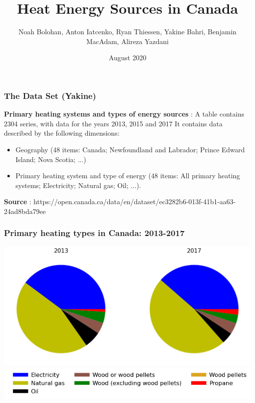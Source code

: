 \documentclass{beamer}
\title{Heat Energy Sources in Canada}
\author[Team 9]{Noah Bolohan, Anton Iatcenko, Ryan Thiessen, Yakine Bahri, Benjamin MacAdam, Alireza Yazdani}
\institute[]{Math\textsuperscript{Industry}}
\date{August 2020}
\begin{document}
\frame{\titlepage}

\begin{frame}
\frametitle{The Data Set (Yakine)}
\textbf{Primary heating systems and types of energy sources} : A table contains 2304 series, with data for the years 2013, 2015 and 2017
It contains data described by the following dimensions:
\begin{itemize}
\item Geography (48 items: Canada; Newfoundland and Labrador; Prince Edward Island; Nova Scotia; ...)
\item Primary heating system and type of energy (48 items: All primary heating systems; Electricity; Natural gas; Oil; ...).
\end{itemize}
\textbf{Source} : https://open.canada.ca/data/en/dataset/ec3282b6-013f-41b1-aa63-24ad8bda79ee
\end{frame}


\begin{frame}
\frametitle{Primary heating types in Canada: 2013-2017}
\includegraphics[width=\textwidth]{Canada20132017.png}\\
\includegraphics[width=\linewidth]{leg_bar.png}
\end{frame}
\end{document}
